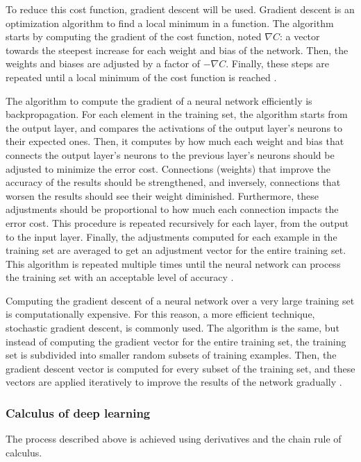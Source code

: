 ﻿\documentclass[12pt,a4paper,notitlepage]{article}
\begin{document}
To reduce this cost function, gradient descent will be used. Gradient descent is an optimization algorithm to find a local minimum in a function. The algorithm starts by computing the gradient of the cost function, noted \(\nabla C\): a vector towards the steepest increase for each weight and bias of the network. Then, the weights and biases are adjusted by a factor of \(-\nabla C\). Finally, these steps are repeated until a local minimum of the cost function is reached \cite{sanderson_gradient_2017}.

The algorithm to compute the gradient of a neural network  efficiently is backpropagation. For each element in the training set, the algorithm starts from the output layer, and compares the activations of the output layer's neurons to their expected ones. Then, it computes by how much each weight and bias that connects the output layer's neurons to the previous layer's neurons should be adjusted to minimize the error cost.  Connections (weights) that improve the accuracy of the results should be strengthened, and inversely, connections that worsen the results should see their weight diminished. Furthermore, these adjustments should be proportional to how much each connection impacts the error cost. This procedure is repeated recursively for each layer, from the output to the input layer. Finally, the adjustments computed for each example in the training set are averaged to get an adjustment vector for the entire training set. This algorithm is repeated multiple times until the neural network can process the training set with an acceptable level of accuracy \cite{sanderson_gradient_2017}.

Computing the gradient descent of a neural network over a very large training set is computationally expensive. For this reason, a more efficient technique, stochastic gradient descent, is commonly used. The algorithm is the same, but instead of computing the gradient vector for the entire training set, the training set is subdivided into smaller random subsets of training examples. Then, the gradient descent vector is computed for every subset of the training set, and these vectors are applied iteratively to improve the results of the network gradually \cite{sanderson_gradient_2017}.

\subsubsection{Calculus of deep learning}
The process described above is achieved using derivatives and the chain rule of calculus.
\end{document}

